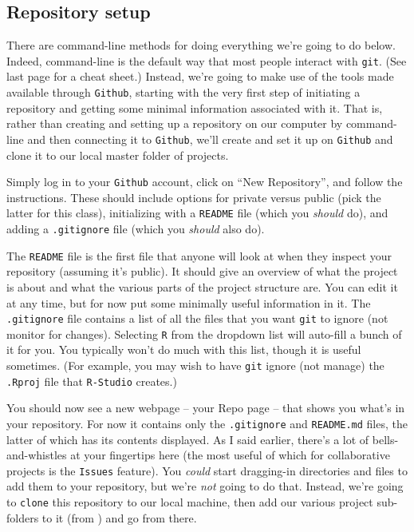 \documentclass[12pt,letterpaper]{article}
\begin{document}
\subsection{Repository setup}
There are command-line methods for doing everything we're going to do below.  Indeed, command-line is the default way that most people interact with \texttt{git}. (See last page for a cheat sheet.)  Instead, we're going to make use of the tools made available through \texttt{Github}, starting with the very first step of initiating a repository and getting some minimal information associated with it.  That is, rather than creating and setting up a repository on our computer by command-line and then connecting it to \texttt{Github}, we'll create and set it up on \texttt{Github} and clone it to our local  master folder of projects.

Simply log in to your \texttt{Github} account, click on ``New Repository'', and follow the instructions.  These should include options for private versus public (pick the latter for this class), initializing with a \texttt{README} file (which you \emph{should} do), and adding a \texttt{.gitignore} file (which you \emph{should} also do).

The \texttt{README} file is the first file that anyone will look at when they inspect your repository (assuming it's public).  It should give an overview of what the project is about and what the various parts of the project structure are.  You can edit it at any time, but for now put some minimally useful information in it.   The \texttt{.gitignore} file contains a list of all the files that you want \texttt{git} to ignore (not monitor for changes).  Selecting \texttt{R} from the dropdown list will auto-fill a bunch of it for you.  You typically won't do much with this list, though it is useful sometimes.  (For example, you may wish to have \texttt{git} ignore (not manage) the \texttt{.Rproj} file that \texttt{R-Studio} creates.)

You should now see a new webpage -- your Repo page -- that shows you what's in your repository.  For now it contains only the  \texttt{.gitignore} and \texttt{README.md} files, the latter of which has its contents displayed.  As I said earlier, there's a lot of bells-and-whistles at your fingertips here (the most useful of which for collaborative projects is the \texttt{Issues} feature).  You \emph{could} start dragging-in directories and files to add them to your repository, but we're \emph{not} going to do that.  Instead, we're going to \texttt{clone} this repository to our local machine, then add our various project sub-folders to it (from ) and go from there.
\end{document}
